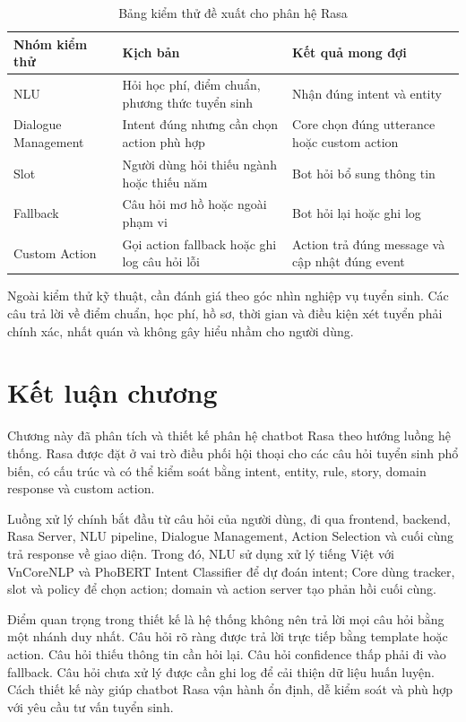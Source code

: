 \documentclass[12pt,a4paper]{report}
\begin{document}
\begin{table}[H]
\centering
\begin{tabular}{|p{3.5cm}|p{4.5cm}|p{5cm}|}
\hline
\textbf{Nhóm kiểm thử} & \textbf{Kịch bản} & \textbf{Kết quả mong đợi} \\
\hline
NLU & Hỏi học phí, điểm chuẩn, phương thức tuyển sinh & Nhận đúng intent và entity \\
\hline
Dialogue Management & Intent đúng nhưng cần chọn action phù hợp & Core chọn đúng utterance hoặc custom action \\
\hline
Slot & Người dùng hỏi thiếu ngành hoặc thiếu năm & Bot hỏi bổ sung thông tin \\
\hline
Fallback & Câu hỏi mơ hồ hoặc ngoài phạm vi & Bot hỏi lại hoặc ghi log \\
\hline
Custom Action & Gọi action fallback hoặc ghi log câu hỏi lỗi & Action trả đúng message và cập nhật đúng event \\
\hline
\end{tabular}
\caption{Bảng kiểm thử đề xuất cho phân hệ Rasa}
\label{tab:rasa-testing-plan}
\end{table}

Ngoài kiểm thử kỹ thuật, cần đánh giá theo góc nhìn nghiệp vụ tuyển sinh. Các câu trả lời về điểm chuẩn, học phí, hồ sơ, thời gian và điều kiện xét tuyển phải chính xác, nhất quán và không gây hiểu nhầm cho người dùng.

\section{Kết luận chương}

Chương này đã phân tích và thiết kế phân hệ chatbot Rasa theo hướng luồng hệ thống. Rasa được đặt ở vai trò điều phối hội thoại cho các câu hỏi tuyển sinh phổ biến, có cấu trúc và có thể kiểm soát bằng intent, entity, rule, story, domain response và custom action.

Luồng xử lý chính bắt đầu từ câu hỏi của người dùng, đi qua frontend, backend, Rasa Server, NLU pipeline, Dialogue Management, Action Selection và cuối cùng trả response về giao diện. Trong đó, NLU sử dụng xử lý tiếng Việt với VnCoreNLP và PhoBERT Intent Classifier để dự đoán intent; Core dùng tracker, slot và policy để chọn action; domain và action server tạo phản hồi cuối cùng.

Điểm quan trọng trong thiết kế là hệ thống không nên trả lời mọi câu hỏi bằng một nhánh duy nhất. Câu hỏi rõ ràng được trả lời trực tiếp bằng template hoặc action. Câu hỏi thiếu thông tin cần hỏi lại. Câu hỏi confidence thấp phải đi vào fallback. Câu hỏi chưa xử lý được cần ghi log để cải thiện dữ liệu huấn luyện. Cách thiết kế này giúp chatbot Rasa vận hành ổn định, dễ kiểm soát và phù hợp với yêu cầu tư vấn tuyển sinh.
\end{document}
